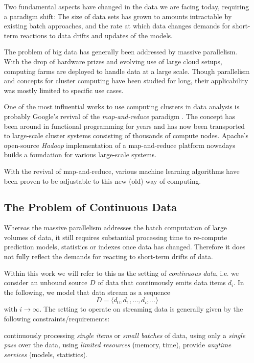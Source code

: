 Two fundamental aspects have changed in the data we are facing today,
requiring a paradigm shift: The size of data sets has grown to amounts
intractable by existing batch approaches, and the rate at which data
changes demands for short-term reactions to data drifts and updates of
the models.

The problem of big data has generally been addressed by massive
parallelism. With the drop of hardware prizes and evolving use of
large cloud setups, computing farms are deployed to handle data at a
large scale. Though parallelism and concepts for cluster computing
have been studied for long, their applicability was mostly limited to
specific use cases.

One of the most influential works to use computing clusters in data
analysis is probably Google's revival of the {\em map-and-reduce}
paradigm \cite{googleMapReduce}. The concept has been around in
functional programming for years and has now been transported to
large-scale cluster systems consisting of thousands of compute
nodes. Apache's open-source {\em Hadoop} implementation of a
map-and-reduce platform nowadays builds a foundation for various
large-scale systems.

With the revival of map-and-reduce, various machine learning algorithms
have been proven to be adjustable to this new (old) way of computing.

\subsection{\label{sec:streamSetting}The Problem of Continuous Data}
Whereas the massive parallelism addresses the batch computation of
large volumes of data, it still requires substantial processing time
to re-compute prediction models, statistics or indexes once data has
changed. Therefore it does not fully reflect the demands for reacting
to short-term drifts of data.

Within this work we will refer to this as the setting of {\em
  continuous data}, i.e. we consider an unbound source $D$ of data
that continuously emits data items $d_i$. In the following, we model
that data stream as a sequence
$$D = \langle d_0,d_1,\ldots,d_i,\ldots \rangle$$
with $i\rightarrow\infty$. The setting to operate on streaming data is
generally given by the following constraints/requirements:
\begin{itemize}
   continuously processing {\em single items} or {\em small batches} of data,
   using only a {\em single pass} over the data,
   using {\em limited resources} (memory, time),
   provide {\em anytime services} (models, statistics).
\end{itemize}


